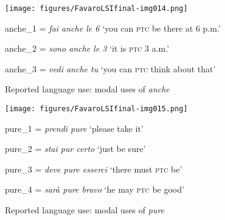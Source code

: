 \begin{figure}[t]
\texttt{[image: figures/FavaroLSIfinal-img014.png]}

{\raggedright\small
anche\_1 = \textit{fai anche le 6} ‘you can \textsc{ptc} be there at 6 p.m.’

anche\_2 = \textit{sono anche le 3} ‘it is \textsc{ptc} 3 a.m.’

anche\_3 = \textit{vedi anche tu} ‘you can \textsc{ptc} think about that’\par}

\caption{\label{fig:key:9.1} Reported language use: modal uses of \textit{anche} }
\end{figure}

\begin{figure}[t]
\texttt{[image: figures/FavaroLSIfinal-img015.png]}

{\raggedright\small
pure\_1 = \textit{prendi pure} ‘please take it’

pure\_2 = \textit{stai pur certo} ‘just be sure’

pure\_3 = \textit{deve pure esserci} ‘there must \textsc{ptc} be’

pure\_4 = \textit{sarà pure bravo} ‘he may \textsc{ptc} be good’\par}

\caption{\label{fig:key:9.2} Reported language use: modal uses of \textit{pure} }
\end{figure}

